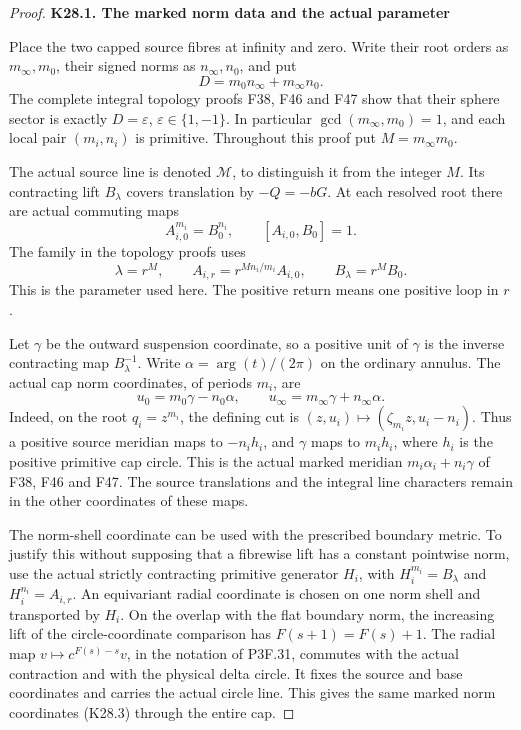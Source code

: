 \begin{proof}
\par

\medskip\noindent\textbf{K28.1. The marked norm data and the actual parameter}

\par\nobreak

Place the two capped source fibres at infinity and zero. Write their root
orders as \(m_\infty,m_0\), their signed norms as \(n_\infty,n_0\), and put
\[
 D=m_0n_\infty+m_\infty n_0.
 \tag{K28.1}
\]
The complete integral topology proofs F38, F46 and F47 show that their sphere
sector is exactly \(D=\varepsilon\), \(\varepsilon\in\{1,-1\}\). In particular
\(\gcd(m_\infty,m_0)=1\), and each local pair \((m_i,n_i)\) is primitive.
Throughout this proof put \(M=m_\infty m_0\).

The actual source line is denoted \(\mathcal M\), to distinguish it from the
integer \(M\). Its contracting lift \(B_\lambda\) covers translation by
\(-Q=-bG\). At each resolved root there are actual commuting maps
\[
 A_{i,0}^{m_i}=B_0^{n_i},\qquad [A_{i,0},B_0]=1 .
\]
The family in the topology proofs uses
\[
 \lambda=r^M,\qquad
 A_{i,r}=r^{M n_i/m_i}A_{i,0},\qquad
 B_\lambda=r^M B_0 .
 \tag{K28.2}
\]
This is the parameter used here. The positive return means one positive
loop in \(r\).

Let \(\gamma\) be the outward suspension coordinate, so a positive unit
of \(\gamma\) is the inverse contracting map \(B_\lambda^{-1}\). Write
\(\alpha=\arg(t)/(2\pi)\) on the ordinary annulus. The actual cap norm
coordinates, of periods \(m_i\), are
\[
 u_0=m_0\gamma-n_0\alpha,\qquad
 u_\infty=m_\infty\gamma+n_\infty\alpha.
 \tag{K28.3}
\]
Indeed, on the root \(q_i=z^{m_i}\), the defining cut is
\((z,u_i)\mapsto(\zeta_{m_i}z,u_i-n_i)\). Thus a positive source
meridian maps to \(-n_i h_i\), and \(\gamma\) maps to \(m_i h_i\),
where \(h_i\) is the positive primitive cap circle. This is the actual
marked meridian \(m_i\alpha_i+n_i\gamma\) of F38, F46 and F47.
The source translations and the integral line characters remain in the
other coordinates of these maps.

The norm-shell coordinate can be used with the prescribed boundary metric.
To justify this without supposing that a fibrewise lift has a constant
pointwise norm, use the actual strictly contracting primitive generator
\(H_i\), with \(H_i^{m_i}=B_\lambda\) and \(H_i^{n_i}=A_{i,r}\).
An equivariant radial coordinate is chosen on one norm shell and transported
by \(H_i\). On the overlap with the flat boundary norm, the increasing lift
of the circle-coordinate comparison has \(F(s+1)=F(s)+1\). The radial map
\(v\mapsto c^{F(s)-s}v\), in the notation of P3F.31, commutes with the
actual contraction and with the physical delta circle. It fixes the source
and base coordinates and carries the actual circle line. This gives the
same marked norm coordinates (K28.3) through the entire cap.


\end{proof}
